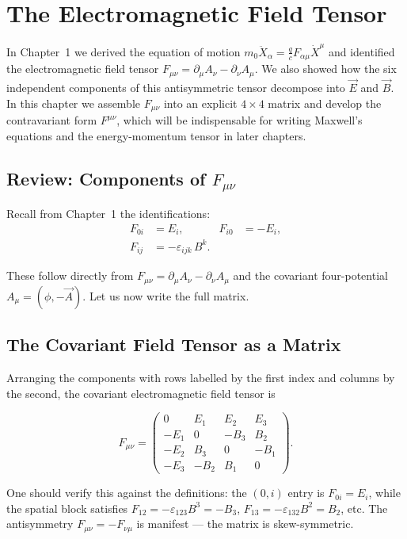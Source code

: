 \chapter{The Electromagnetic Field Tensor}

In Chapter~1 we derived the equation of motion $m_0\ddot{X}_\alpha = \frac{q}{c}F_{\alpha\mu}\dot{X}^\mu$ and identified the electromagnetic field tensor $F_{\mu\nu} = \partial_\mu A_\nu - \partial_\nu A_\mu$. We also showed how the six independent components of this antisymmetric tensor decompose into $\vec{E}$ and $\vec{B}$. In this chapter we assemble $F_{\mu\nu}$ into an explicit $4\times4$ matrix and develop the contravariant form $F^{\mu\nu}$, which will be indispensable for writing Maxwell's equations and the energy-momentum tensor in later chapters.

\section{Review: Components of $F_{\mu\nu}$}

Recall from Chapter~1 the identifications:
\begin{align}
F_{0i} &= E_i, & F_{i0} &= -E_i, \\
F_{ij} &= -\varepsilon_{ijk}\,B^k.
\end{align}

These follow directly from $F_{\mu\nu} = \partial_\mu A_\nu - \partial_\nu A_\mu$ and the covariant four-potential $A_\mu = (\phi, -\vec{A})$. Let us now write the full matrix.

\section{The Covariant Field Tensor as a Matrix}

Arranging the components with rows labelled by the first index and columns by the second, the covariant electromagnetic field tensor is

\begin{equation}
\boxed{
F_{\mu\nu} = \begin{pmatrix}
0 & E_1 & E_2 & E_3 \\
-E_1 & 0 & -B_3 & B_2 \\
-E_2 & B_3 & 0 & -B_1 \\
-E_3 & -B_2 & B_1 & 0
\end{pmatrix}.}
\end{equation}

One should verify this against the definitions: the $(0,i)$ entry is $F_{0i} = E_i$, while the spatial block satisfies $F_{12} = -\varepsilon_{123}B^3 = -B_3$, $F_{13} = -\varepsilon_{132}B^2 = B_2$, etc. The antisymmetry $F_{\mu\nu} = -F_{\nu\mu}$ is manifest --- the matrix is skew-symmetric.

